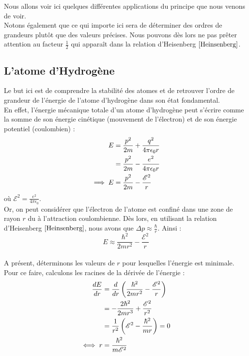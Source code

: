 \documentclass[../Notes de cours]{subfiles}
\begin{document}
Nous allons voir ici quelques différentes applications du principe que nous venons de voir.\\
Notons également que ce qui importe ici sera de déterminer des ordres de grandeurs plutôt que des valeurs précises. Nous pouvons dès lors ne pas prêter attention au facteur $\frac{1}{2}$ qui apparaît dans la relation d'Heisenberg $\ref{Heinsenberg}$.

\subsection{L'atome d'Hydrogène}
Le but ici est de comprendre la stabilité des atomes et de retrouver l'ordre de grandeur de l'énergie de l'atome d'hydrogène dans son état fondamental. \\

En effet, l'énergie mécanique totale d'un atome d'hydrogène peut s'écrire comme la somme de son énergie cinétique (mouvement de l'électron) et de son énergie potentiel (coulombien) : 
\begin{align}
\label{Energie hydrogène}
E &= \frac{p^2}{2m} + \frac{q^2}{4\pi \epsilon_0 r} \notag \\
&= \frac{p^2}{2m} - \frac{e^2}{4 \pi \epsilon_0 r} \notag \\
\implies E &= \frac{p^2}{2m} - \frac{\mathcal{E}^2}{r}
\end{align}
où $\mathcal{E}^2 = \frac{e^2}{4 \pi \epsilon_0}$.\\

Or, on peut considérer que l'électron de l'atome est confiné dans une zone de rayon $r$ du à l'attraction coulombienne. 
Dès lors, en utilisant la relation d'Heisenberg $\ref{Heinsenberg}$, nous avons que $\Delta p \approx \frac{\hbar}{r}$. Ainsi : 
\begin{equation}
\label{Energie hydrogene approx}
E \approx \frac{\hbar^2}{2mr^2} - \frac{\mathcal{E}^2}{r}
\end{equation}
\paragraph{} A présent, déterminons les valeurs de $r$ pour lesquelles l'énergie est minimale. Pour ce faire, calculons les racines de la dérivée de l'énergie :
\begin{align}
\label{rayon d'energie minimale}
\frac{dE}{dr} &= \frac{d}{dr} \left( \frac{\hbar^2}{2mr^2} - \frac{\mathcal{E}^2}{r} \right) \notag \\
&= - \frac{2\hbar^2}{2mr^3} + \frac{\mathcal{E}^2}{r^2} \notag \\
&= \frac{1}{r^2} \left( \mathcal{E}^2 - \frac{\hbar^2}{mr} \right) = 0 \notag \\
\iff r&= \frac{\hbar^2}{m\mathcal{E}^2}
\end{align}
\end{document}
